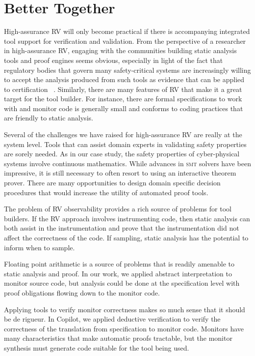 \section{Better Together}\label{sec:oportunities} 
High-assurance RV will only become practical if there is accompanying
integrated tool support for verification and validation.  From the
perspective of a researcher in high-assurance RV, engaging with the
communities building static analysis tools and proof engines seems
obvious, especially in light of the fact that regulatory bodies that
govern many safety-critical systems are increasingly willing to accept
the analysis produced from such tools as evidence that can be applied to
certification ~\cite{DO333}. Similarly, there are many features of RV
that make it a great target for the tool builder. For instance, there are formal
specifications to work with  and monitor code is generally small and
conforms to coding practices that are friendly to static analysis. 

 
Several of the challenges we have raised for high-assurance RV are
really at the system level. Tools that can assist domain experts in
validating safety properties are sorely needed.  As in our case study,
the safety properties of cyber-physical systems involve continuous
mathematics. While advances in \textsc{smt} solvers have been
impressive, it is still necessary to often resort to using an  interactive
theorem prover. There are many opportunities to design
domain specific decision procedures that would increase the utility of
automated proof
tools.  

The problem of RV observability provides a rich source of problems for tool builders. If the RV
approach involves instrumenting code, then static analysis can both
assist in the instrumentation and prove that the instrumentation did
not affect the correctness of the code. If sampling, static analysis
has the potential to inform when to sample.

Floating point arithmetic is a source of problems that is readily
amenable to static analysis and proof. In our work, we applied
abstract interpretation to monitor source code, but analysis could be
done at the specification level with proof obligations flowing down to
the monitor code.

Applying tools to verify monitor correctness makes so much sense that
it should be de rigueur.  In Copilot, we applied deductive
verification to verify the correctness of the translation from
specification to monitor code.  Monitors have many characteristics
that make automatic proofs tractable, but the monitor synthesis must
generate code  suitable for the tool being used.   